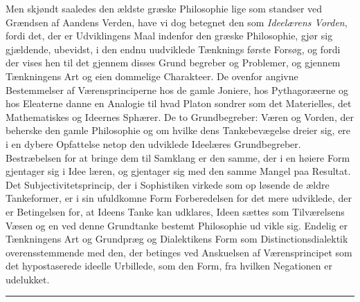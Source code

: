 \documentclass[12pt,a4paper]{book}
\newcommand{\divrule}{\begin{center}\rule{2cm}{0.4pt}\end{center}}
\begin{document}
Men skjøndt saaledes den ældste græske Philosophie lige\-%
som standser ved Grændsen af Aandens Verden, have vi dog
betegnet den som \emph{Ideelærens Vorden}, fordi det, der er
Udviklingens Maal indenfor den græske Philosophie, gjør sig
gjældende, ubevidst, i den endnu uudviklede Tænknings første
Forsøg, og fordi der vises hen til det gjennem disses Grund\-%
begreber og Problemer, og gjennem Tænkningens Art og eien\-%
dommelige Charakteer. De ovenfor angivne Bestemmelser af
Værensprinciperne hos de gamle Joniere, hos Pythagoræerne
og hos Eleaterne danne en Analogie til hvad Platon sondrer
som det Materielles, det Mathematiskes og Ideernes Sphærer.
De to Grundbegreber: Væren og Vorden, der beherske den
gamle Philosophie og om hvilke dens Tankebevægelse dreier
sig, ere i en dybere Opfattelse netop den udviklede Ideelæres
Grundbegreber. Bestræbelsen for at bringe dem til Samklang
er den samme, der i en høiere Form gjentager sig i Idee\-%
læren, og gjentager sig med den samme Mangel paa Resultat.
Det Subjectivitetsprincip, der i Sophistiken virkede som op\-%
løsende de ældre Tankeformer, er i sin ufuldkomne Form
Forberedelsen for det mere udviklede, der er Betingelsen for,
at Ideens Tanke kan udklares, Ideen sættes som Tilværelsens
Væsen og en ved denne Grundtanke bestemt Philosophie ud\-%
vikle sig. Endelig er Tænkningens Art og Grundpræg og
Dialektikens Form som Distinctionsdialektik overensstemmende
med den, der betinges ved Anskuelsen af Værensprincipet
som det hypostaserede ideelle Urbillede, som den Form, fra
hvilken Negationen er udelukket.
\divrule
\end{document}
